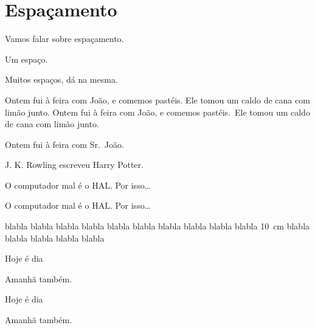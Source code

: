 \documentclass[12pt]{memoir}
\begin{document}
\chapter{Espaçamento}

Vamos falar sobre espaçamento.

Um espaço.




Muitos       espaços, dá na mesma.

Ontem fui à feira com João,
e comemos pastéis. Ele tomou
um caldo de cana com limão junto.
Ontem fui à feira com João,
e comemos pastéis.\ Ele tomou
um caldo de cana com limão junto.

Ontem fui à feira com Sr.\ João.

J. K. Rowling escreveu Harry Potter.

O computador mal é o HAL. Por isso\ldots

O computador mal é o HAL\@. Por isso\ldots

blabla blabla blabla blabla blabla blabla blabla blabla blabla 
blabla 10~cm blabla blabla blabla blabla blabla 

Hoje é dia\par Amanhã também.

Hoje é dia

Amanhã também.
\end{document}
